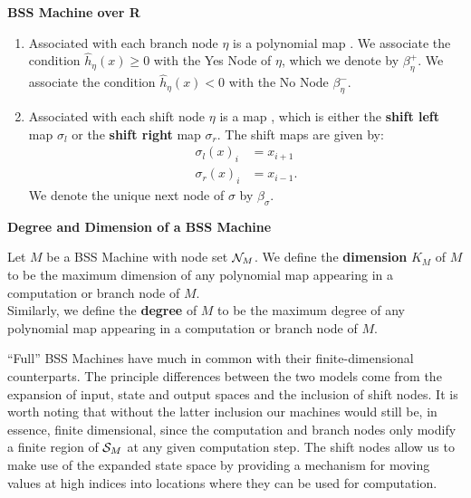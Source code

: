 \begin{definition}{\textbf{BSS Machine over R}}
\begin{enumerate}
    \item Associated with each branch node $\eta$ is a polynomial map
      .  We associate the
      condition $\widehat{h}_\eta(x) \geq 0$ with the Yes Node of
      $\eta$, which we denote by $\beta_\eta^+$.  We associate the
      condition $\widehat{h}_\eta(x) < 0$ with the No Node
      $\beta_\eta^-$.

    \item Associated with each shift node $\eta$ is a map
      , which is either the
      \textbf{shift left} map $\sigma_l$ or the \textbf{shift right}
      map $\sigma_r$.  The shift maps are given by:
      \begin{align*}
        \sigma_l(x)_i &= x_{i+1}\\
        \sigma_r(x)_i &= x_{i-1}.
      \end{align*}
      We denote the unique next node of $\sigma$ by
      $\beta_\sigma$. 
    \end{enumerate}
  \end{definition}

  \begin{definition}{\textbf{Degree and Dimension of a BSS Machine}}
    
    Let $M$ be a BSS Machine with node set $\mathcal{N}_M$.  We define the
    \textbf{dimension} $K_M$ of $M$ to be the maximum dimension of any
    polynomial map appearing in a computation or branch node of $M$.\\
    
    Similarly, we define the \textbf{degree} of $M$ to be the maximum
    degree of any polynomial map appearing in a computation or branch
    node of $M$.
    
  \end{definition}

  ``Full'' BSS Machines have much in common with their
  finite-dimensional counterparts.  The principle differences between
  the two models come from the expansion of input, state and output
  spaces and the inclusion of shift nodes.  It is worth noting that
  without the latter inclusion our machines would still be, in
  essence, finite dimensional, since the computation and branch nodes
  only modify a finite region of $\mathcal{S}_M$ at any given
  computation step.  The shift nodes allow us to make use of the
  expanded state space by providing a mechanism for moving values at
  high indices into locations where they can be used for computation.

